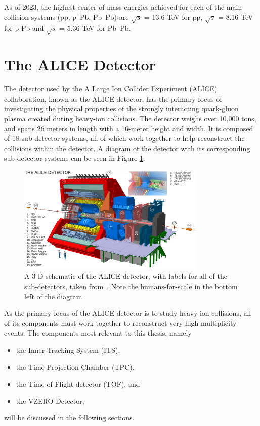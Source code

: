 As of 2023, the highest center of mass energies achieved for each of the main collision systems (pp, p--Pb, Pb--Pb) are $\sqrt{s}$ = 13.6 TeV for pp, $\sqrt{s}$ = 8.16 TeV for p-Pb and $\sqrt{s}$ = 5.36 TeV for Pb--Pb. 

\clearpage 

\section{The ALICE Detector}
The detector used by the A Large Ion Collider Experiment (ALICE) collaboration, known as the ALICE detector, has the primary focus of investigating the physical properties of the strongly interacting quark-gluon plasma created during heavy-ion collisions.
The detector weighs over 10,000 tons, and spans 26 meters in length with a 16-meter height and width. It is composed of 18 sub-detector systems, all of which work together to help reconstruct the collisions within the detector. A diagram of the detector with its corresponding sub-detector systems can be seen in Figure \ref{fig:alice_detector}.
\begin{figure}
    \centering
    \includegraphics[width=0.8\textwidth]{figures/experiment/ALICE_detector_schematic.png}
    \caption{A 3-D schematic of the ALICE detector, with labels for all of the sub-detectors, taken from~\cite{ALICEDiagram}. Note the humans-for-scale in the bottom left of the diagram.}
    \label{fig:alice_detector}
\end{figure}
As the primary focus of the ALICE detector is to study heavy-ion collisions, all of its components must work together to reconstruct very high multiplicity events. The components most relevant to this thesis, namely 
\begin{itemize}
    \item the Inner Tracking System (ITS),
    \item the Time Projection Chamber (TPC),
    \item the Time of Flight detector (TOF), and
    \item the VZERO Detector,
\end{itemize}
will be discussed in the following sections.


